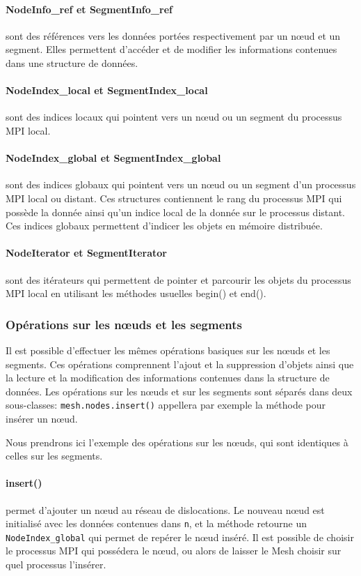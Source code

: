\paragraph{NodeInfo\_ref et SegmentInfo\_ref} sont des références vers les données portées respectivement par un nœud et un segment. Elles permettent d'accéder et de modifier les informations contenues dans une structure de données. 

\paragraph{NodeIndex\_local et SegmentIndex\_local} sont des indices locaux qui pointent vers un nœud ou un segment du processus MPI local.

\paragraph{NodeIndex\_global et SegmentIndex\_global} sont des indices globaux qui pointent vers un nœud ou un segment d'un processus MPI local ou distant. Ces structures contiennent le rang du processus MPI qui possède la donnée ainsi qu'un indice local de la donnée sur le processus distant. Ces indices globaux permettent d'indicer les objets en mémoire distribuée.

\paragraph{NodeIterator et SegmentIterator} sont des itérateurs qui permettent de pointer et parcourir les objets du processus MPI local en utilisant les méthodes usuelles begin() et end().

\subsubsection{Opérations sur les nœuds et les segments}

Il est possible d'effectuer les mêmes opérations basiques sur les nœuds et les segments. Ces opérations comprennent l'ajout et la suppression d'objets ainsi que la lecture et la modification des informations contenues dans la structure de données. Les opérations sur les nœuds et sur les segments sont séparés dans deux sous-classes: \verb|mesh.nodes.insert()| appellera par exemple la méthode pour insérer un nœud.

Nous prendrons ici l'exemple des opérations sur les nœuds, qui sont identiques à celles sur les segments.

\paragraph{insert()} permet d'ajouter un nœud au réseau de dislocations. Le nouveau nœud est initialisé avec les données contenues dans \verb|n|, et la méthode retourne un \verb|NodeIndex_global| qui permet de repérer le nœud inséré. Il est possible de choisir le processus MPI qui possédera le nœud, ou alors de laisser le Mesh choisir sur quel processus l'insérer.

